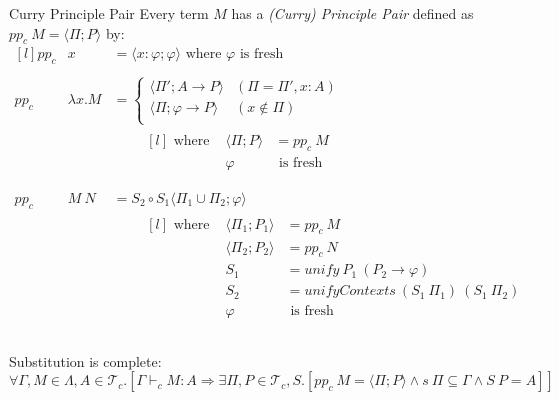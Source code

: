 \begin{definitionbox}{Curry Principle Pair}
	Every term $M$ has a \textit{(Curry) Principle Pair} defined as $pp_c \ M = \langle \Pi ; P \rangle$ by:
	\[\begin{matrix*}[l]
			pp_c & x & = \langle x: \varphi ; \varphi \rangle \text{ where } \varphi \text{ is fresh} \\
			\\
			pp_c & \lambda x. M & = \begin{cases}
				\langle \Pi' ; A \to P \rangle     & (\Pi = \Pi', x:A) \\
				\langle \Pi; \varphi \to P \rangle & (x \not\in \Pi)   \\
			\end{cases} \\
			& & \qquad \begin{matrix*}[l]
				\text{ where } & \langle \Pi; P \rangle &= pp_c \ M \\
				& \varphi & \text{ is fresh}  \\
			\end{matrix*} \\
			\\
			pp_c & M \ N & = S_2 \circ S_1 \langle \Pi_1 \cup \Pi_2 ; \varphi \rangle \\
			& & \qquad \begin{matrix*}[l]
				\text{ where } & \langle \Pi_1 ; P_1 \rangle & = pp_c \ M \\
				& \langle \Pi_2 ; P_2 \rangle & = pp_c \ N \\
				& S_1 & = unify \ P_1 \ (P_2 \to \varphi) \\
				& S_2 & = unifyContexts \ (S_1 \ \Pi_1) \ (S_1 \ \Pi_2) \\
				& \varphi & \text{ is fresh} \\
			\end{matrix*} \\
		\end{matrix*}\]
\end{definitionbox}

Substitution is complete:
\[\forall \Gamma, M \in \Lambda, A \in \mathcal{T}_c . [\Gamma \vdash_c M : A \Rightarrow \exists \Pi, P \in \mathcal{T}_c, S . [pp_c \ M = \langle \Pi ; P \rangle \land s \ \Pi \subseteq \Gamma \land S \ P = A]]\]
